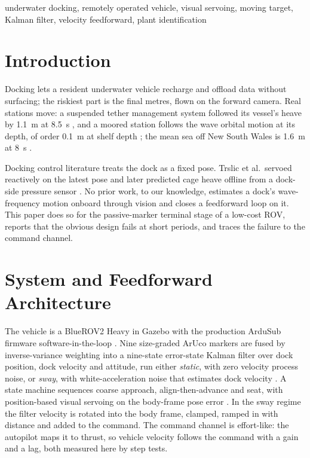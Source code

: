 \documentclass[conference,a4paper]{IEEEtran}
\begin{document}
\begin{IEEEkeywords}
underwater docking, remotely operated vehicle, visual servoing, moving target, Kalman filter, velocity feedforward, plant identification
\end{IEEEkeywords}

\section{Introduction}

Docking lets a resident underwater vehicle recharge and offload data without surfacing; the riskiest part is the final metres, flown on the forward camera. Real stations move: a suspended tether management system followed its vessel's heave by 1.1~m at 8.5~s \cite{trslic2020vision}, and a moored station follows the wave orbital motion at its depth, of order 0.1~m at shelf depth \cite{holthuijsen2007waves}; the mean sea off New South Wales is 1.6~m at 8~s \cite{short1992wave}.

Docking control literature treats the dock as a fixed pose. Trslic et al.\ servoed reactively on the latest pose and later predicted cage heave offline from a dock-side pressure sensor \cite{trslic2020vision,trslic2020neuro}. No prior work, to our knowledge, estimates a dock's wave-frequency motion onboard through vision and closes a feedforward loop on it. This paper does so for the passive-marker terminal stage of a low-cost ROV, reports that the obvious design fails at short periods, and traces the failure to the command channel.

\section{System and Feedforward Architecture}

The vehicle is a BlueROV2 Heavy in Gazebo with the production ArduSub firmware software-in-the-loop \cite{blue2024software}. Nine size-graded ArUco markers \cite{garrido2014automatic} are fused by inverse-variance weighting into a nine-state error-state Kalman filter over dock position, dock velocity and attitude, run either \emph{static}, with zero velocity process noise, or \emph{sway}, with white-acceleration noise that estimates dock velocity \cite{barshalom2001estimation}. A state machine sequences coarse approach, align-then-advance and seat, with position-based visual servoing on the body-frame pose error \cite{chaumette2006visual}. In the sway regime the filter velocity is rotated into the body frame, clamped, ramped in with distance and added to the command. The command channel is effort-like: the autopilot maps it to thrust, so vehicle velocity follows the command with a gain and a lag, both measured here by step tests.
\end{document}

